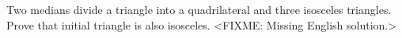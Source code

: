 \problem{}
Two medians divide a triangle into a quadrilateral and three isosceles triangles.
Prove that initial triangle is also isosceles.
\solution
<FIXME: Missing English solution.>
\endproblem
